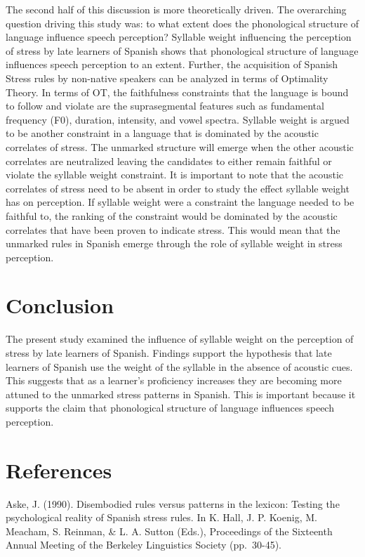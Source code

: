 \documentclass[man]{apa6}
\theoremstyle{definition}
\theoremstyle{definition}
\theoremstyle{definition}
\theoremstyle{remark}
\begin{document}
The second half of this discussion is more theoretically driven. The
overarching question driving this study was: to what extent does the
phonological structure of language influence speech perception? Syllable
weight influencing the perception of stress by late learners of Spanish
shows that phonological structure of language influences speech
perception to an extent. Further, the acquisition of Spanish Stress
rules by non-native speakers can be analyzed in terms of Optimality
Theory. In terms of OT, the faithfulness constraints that the language
is bound to follow and violate are the suprasegmental features such as
fundamental frequency (F0), duration, intensity, and vowel spectra.
Syllable weight is argued to be another constraint in a language that is
dominated by the acoustic correlates of stress. The unmarked structure
will emerge when the other acoustic correlates are neutralized leaving
the candidates to either remain faithful or violate the syllable weight
constraint. It is important to note that the acoustic correlates of
stress need to be absent in order to study the effect syllable weight
has on perception. If syllable weight were a constraint the language
needed to be faithful to, the ranking of the constraint would be
dominated by the acoustic correlates that have been proven to indicate
stress. This would mean that the unmarked rules in Spanish emerge
through the role of syllable weight in stress perception.

\section{Conclusion}\label{conclusion}

The present study examined the influence of syllable weight on the
perception of stress by late learners of Spanish. Findings support the
hypothesis that late learners of Spanish use the weight of the syllable
in the absence of acoustic cues. This suggests that as a learner's
proficiency increases they are becoming more attuned to the unmarked
stress patterns in Spanish. This is important because it supports the
claim that phonological structure of language influences speech
perception.

\newpage

\section{References}\label{references}

Aske, J. (1990). Disembodied rules versus patterns in the lexicon:
Testing the psychological reality of Spanish stress rules. In K. Hall,
J. P. Koenig, M. Meacham, S. Reinman, \& L. A. Sutton (Eds.),
Proceedings of the Sixteenth Annual Meeting of the Berkeley Linguistics
Society (pp.~30-45).
\end{document}
